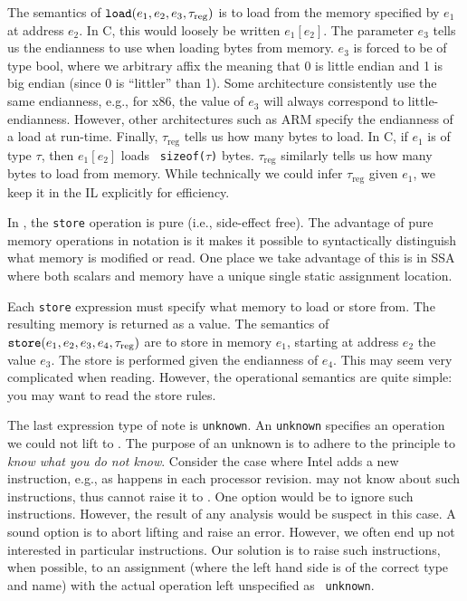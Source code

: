 The semantics of ${\tt load}(e_1, e_2, e_3, \tau_{\text{reg}})$ is to
load from the memory specified by $e_1$ at address $e_2$. In C, this
would loosely be written $e_1[e_2]$.  The parameter $e_3$ tells us the
endianness to use when loading bytes from memory. $e_3$ is forced to
be of type bool, where we arbitrary affix the meaning that 0 is little
endian and 1 is big endian (since 0 is ``littler'' than 1). Some
architecture consistently use the same endianness, e.g., for x86, the
value of $e_3$ will always correspond to little-endianness.  However,
other architectures such as ARM specify the endianness of a load at
run-time.  Finally, $\tau_{\text{reg}}$ tells us how many bytes to
load.  In C, if $e_1$ is of type $\tau$, then $e_1[e_2]$ loads {\tt
  sizeof($\tau$)} bytes.  $\tau_{\text{reg}}$ similarly tells us how
many bytes to load from memory. While technically we could infer
$\tau_{\text{reg}}$ given $e_1$, we keep it in the IL explicitly for
efficiency.


In \bil, the {\tt store} operation is pure (i.e., side-effect
free). The advantage of pure memory operations in \bil notation is it
makes it possible to syntactically distinguish what memory is modified
or read.  One place we take advantage of this is in SSA where both
scalars and memory have a unique single static assignment location.

Each {\tt store} expression must specify what memory to load or store
from.  The resulting memory is returned as a value.  The semantics of
${\tt store}(e_1, e_2, e_3, e_4, \tau_{\text{reg}})$ are to store in
memory $e_1$, starting at address $e_2$ the value $e_3$.  The store is
performed given the endianness of $e_4$.  This may seem very
complicated when reading. However, the operational semantics are quite
simple: you may want to read the  {\sc store} rules.


The last expression type of note is {\tt unknown}.  An {\tt unknown}
specifies an operation we could not lift to \bil.  The purpose of an
unknown is to adhere to the \bap principle to \emph{know what you do
  not know}.  Consider the case where Intel adds a new instruction,
e.g., as happens in each processor revision.  \bap may not know about
such instructions, thus cannot raise it to \bil. One option would be
to ignore such instructions. However, the result of any analysis would
be suspect in this case. A sound option is to abort lifting and raise
an error. However, we often end up not interested in particular
instructions. Our solution is to raise such instructions, when
possible, to an assignment (where the left hand side is of the correct
type and name) with the actual operation left unspecified as {\tt
  unknown}.

